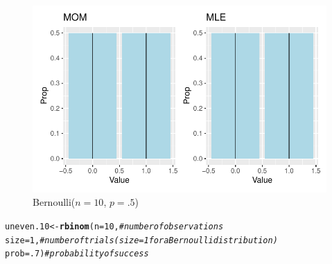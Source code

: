 \documentclass{article}\usepackage[]{graphicx}\usepackage[]{color}
\makeatletter
\def\maxwidth{ %
  \ifdim\Gin@nat@width>\linewidth
    \linewidth
  \else
    \Gin@nat@width
  \fi
}
\newcommand{\hlnum}[1]{\textcolor[rgb]{0.686,0.059,0.569}{#1}}%
\newcommand{\hlcom}[1]{\textcolor[rgb]{0.678,0.584,0.686}{\textit{#1}}}%
\newcommand{\hlstd}[1]{\textcolor[rgb]{0.345,0.345,0.345}{#1}}%
\newcommand{\hlkwb}[1]{\textcolor[rgb]{0.69,0.353,0.396}{#1}}%
\newcommand{\hlkwc}[1]{\textcolor[rgb]{0.333,0.667,0.333}{#1}}%
\newcommand{\hlkwd}[1]{\textcolor[rgb]{0.737,0.353,0.396}{\textbf{#1}}}%
\newenvironment{kframe}{%
 \def\at@end@of@kframe{}%
 \ifinner\ifhmode%
  \def\at@end@of@kframe{\end{minipage}}%
  \begin{minipage}{\columnwidth}%
 \fi\fi%
 \def\FrameCommand##1{\hskip\@totalleftmargin \hskip-\fboxsep
 \colorbox{shadecolor}{##1}\hskip-\fboxsep
     \hskip-\linewidth \hskip-\@totalleftmargin \hskip\columnwidth}%
 \MakeFramed {\advance\hsize-\width
   \@totalleftmargin\z@ \linewidth\hsize
   \@setminipage}}%
 {\par\unskip\endMakeFramed%
 \at@end@of@kframe}
\newenvironment{knitrout}{}{} %
\makeatother
\begin{document}
\begin{enumerate}
\begin{enumerate}
\begin{figure}[H]
  \begin{center}
\begin{knitrout}
\color{fgcolor}
\includegraphics[width=\maxwidth]{figure/unnamed-chunk-49-1} 
\end{knitrout}
    \caption{Bernoulli($n=10$, $p=.5$)}
    \label{p4plot1}%
  \end{center}
\end{figure}

\begin{knitrout}
\color{fgcolor}\begin{kframe}
\begin{alltt}
\hlstd{uneven.10} \hlkwb{<-} \hlkwd{rbinom}\hlstd{(}\hlkwc{n}\hlstd{=}\hlnum{10}\hlstd{,}        \hlcom{#number of observations}
                    \hlkwc{size}\hlstd{=}\hlnum{1}\hlstd{,}        \hlcom{#number of trials (size=1 for a Bernoulli distribution)}
                    \hlkwc{prob}\hlstd{=}\hlnum{.7}\hlstd{)}       \hlcom{#probability of success}


\end{alltt}
\end{kframe}
\end{knitrout}
\end{enumerate}
\end{enumerate}
\end{document}

